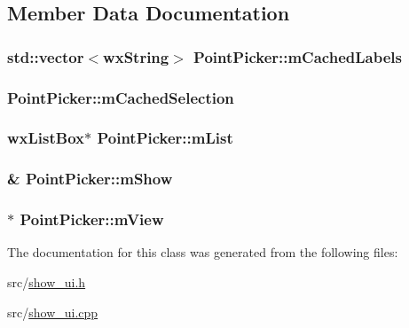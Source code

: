 \subsection{Member Data Documentation}
\hypertarget{a00114_a00af7f5a7fe9ff6b76483e049cd9255f}{
\subsubsection[{m\-Cached\-Labels}]{\setlength{\rightskip}{0pt plus 5cm}std\-::vector$<$wx\-String$>$ Point\-Picker\-::m\-Cached\-Labels\hspace{0.3cm}{\ttfamily [private]}}}\label{a00114_a00af7f5a7fe9ff6b76483e049cd9255f}
\hypertarget{a00114_a3ca4a604fedbc278b3b62a63e90159c3}{
\subsubsection[{m\-Cached\-Selection}]{ Point\-Picker\-::m\-Cached\-Selection\hspace{0.3cm}{\ttfamily [private]}}}\label{a00114_a3ca4a604fedbc278b3b62a63e90159c3}
\hypertarget{a00114_a3666f53d28030b70780b949a400e40e2}{
\subsubsection[{m\-List}]{\setlength{\rightskip}{0pt plus 5cm}wx\-List\-Box$\ast$ Point\-Picker\-::m\-List\hspace{0.3cm}{\ttfamily [private]}}}\label{a00114_a3666f53d28030b70780b949a400e40e2}
\hypertarget{a00114_a224de9bc2a9626685431da5faea7e6fa}{
\subsubsection[{m\-Show}]{\& Point\-Picker\-::m\-Show\hspace{0.3cm}{\ttfamily [private]}}}\label{a00114_a224de9bc2a9626685431da5faea7e6fa}
\hypertarget{a00114_a1b4d9baeb354f46b38c675c19cd3cb03}{
\subsubsection[{m\-View}]{$\ast$ Point\-Picker\-::m\-View\hspace{0.3cm}{\ttfamily [private]}}}\label{a00114_a1b4d9baeb354f46b38c675c19cd3cb03}


The documentation for this class was generated from the following files\-:\begin{DoxyCompactItemize}
\item 
src/\hyperlink{a00245}{show\-\_\-ui.\-h}\item 
src/\hyperlink{a00244}{show\-\_\-ui.\-cpp}\end{DoxyCompactItemize}
